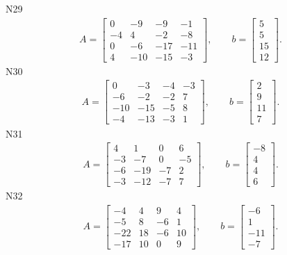 \documentclass[11pt]{report}
\begin{document}
N29
\begin{align*}
 A = \left[\begin{matrix}0 & -9 & -9 & -1\\-4 & 4 & -2 & -8\\0 & -6 & -17 & -11\\4 & -10 & -15 & -3\end{matrix}\right],
\qquad b = \left[\begin{matrix}5\\5\\15\\12\end{matrix}\right]. 
 \end{align*}
N30
\begin{align*}
 A = \left[\begin{matrix}0 & -3 & -4 & -3\\-6 & -2 & -2 & 7\\-10 & -15 & -5 & 8\\-4 & -13 & -3 & 1\end{matrix}\right],
\qquad b = \left[\begin{matrix}2\\9\\11\\7\end{matrix}\right]. 
 \end{align*}
N31
\begin{align*}
 A = \left[\begin{matrix}4 & 1 & 0 & 6\\-3 & -7 & 0 & -5\\-6 & -19 & -7 & 2\\-3 & -12 & -7 & 7\end{matrix}\right],
\qquad b = \left[\begin{matrix}-8\\4\\4\\6\end{matrix}\right]. 
 \end{align*}
N32
\begin{align*}
 A = \left[\begin{matrix}-4 & 4 & 9 & 4\\-5 & 8 & -6 & 1\\-22 & 18 & -6 & 10\\-17 & 10 & 0 & 9\end{matrix}\right],
\qquad b = \left[\begin{matrix}-6\\1\\-11\\-7\end{matrix}\right]. 
 \end{align*}
\end{document}
